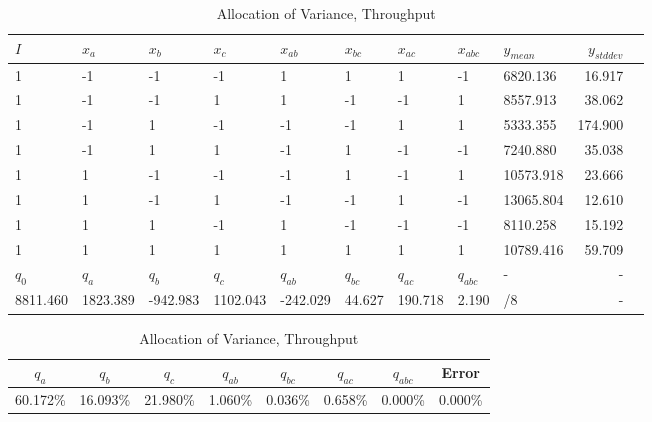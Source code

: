 \documentclass[11pt,a4paper]{article}
\begin{document}
\begin{table}
    \begin{subtable}{1.0\linewidth}\centering
        {\begin{tabular}{lllllllllrr}
            \hline
            $I$ & $x_a$ & $x_b$ & $x_c$ & $x_{ab}$ & $x_{bc}$ & $x_{ac}$ & $x_{abc}$ & $y_{mean}$ & $y_{stddev}$\\
            \hline
                    1 &       -1 &       -1 &       -1 &        1 &      1 &       1 &    -1 &  6820.136 &  16.917 \\
                    1 &       -1 &       -1 &        1 &        1 &     -1 &      -1 &     1 &  8557.913 &  38.062 \\
                    1 &       -1 &        1 &       -1 &       -1 &     -1 &       1 &     1 &  5333.355 & 174.900 \\
                    1 &       -1 &        1 &        1 &       -1 &      1 &      -1 &    -1 &  7240.880 &  35.038 \\
                    1 &        1 &       -1 &       -1 &       -1 &      1 &      -1 &     1 & 10573.918 &  23.666 \\
                    1 &        1 &       -1 &        1 &       -1 &     -1 &       1 &    -1 & 13065.804 &  12.610 \\
                    1 &        1 &        1 &       -1 &        1 &     -1 &      -1 &    -1 &  8110.258 &  15.192 \\
                    1 &        1 &        1 &        1 &        1 &      1 &       1 &     1 & 10789.416 &  59.709 \\
            \hline
            $q_0$ & $q_a$ & $q_b$ & $q_c$ & $q_{ab}$ & $q_{bc}$ & $q_{ac}$ & $q_{abc}$ & - & -\\
             8811.460 & 1823.389 & -942.983 & 1102.043 & -242.029 & 44.627 & 190.718 & 2.190 &  /8 &       - \\
            \hline
        \end{tabular}
        \caption{Parameters and Effect Sizes, Throughput}}
    \end{subtable}
    \begin{subtable}{1.0\linewidth}\centering
        {\begin{tabular}{|cccccccc|}
            \hline
            $q_a$ & $q_b$ & $q_c$ & $q_{ab}$ & $q_{bc}$ & $q_{ac}$ & $q_{abc}$ & Error \\
            \hline
            60.172\% &   16.093\% &   21.980\% &    1.060\% &  0.036\% &   0.658\% & 0.000\% &     0.000\% \\
            \hline
        \end{tabular}
        \caption{Allocation of Variance, Throughput}}
    \end{subtable}


\end{table}
\end{document}
